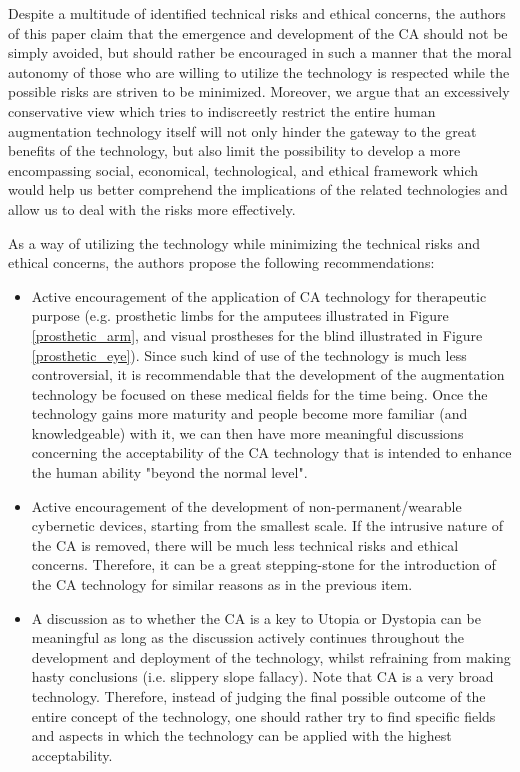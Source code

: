 Despite a multitude of identified technical risks and ethical concerns, the authors of this paper claim that the emergence and development of the CA should not be simply avoided, but should rather be encouraged in such a manner that the moral autonomy of those who are willing to utilize the technology is respected while the possible risks are striven to be minimized. Moreover, we argue that an excessively conservative view which tries to indiscreetly restrict the entire human augmentation technology itself will not only hinder the gateway to the great benefits of the technology, but also limit the possibility to develop a more encompassing social, economical, technological, and ethical framework which would help us better comprehend the implications of the related technologies and allow us to deal with the risks more effectively.

As a way of utilizing the technology while minimizing the technical risks and ethical concerns, the authors propose the following recommendations:

\begin{itemize}
	\item Active encouragement of the application of CA technology for therapeutic purpose (e.g. prosthetic limbs for the amputees illustrated in Figure \ref{prosthetic_arm}, and visual prostheses for the blind illustrated in Figure \ref{prosthetic_eye}). Since such kind of use of the technology is much less controversial, it is recommendable that the development of the augmentation technology be focused on these medical fields for the time being. Once the technology gains more maturity and people become more familiar (and knowledgeable) with it, we can then have more meaningful discussions concerning the acceptability of the CA technology that is intended to enhance the human ability "beyond the normal level".
	\item Active encouragement of the development of non-permanent/wearable cybernetic devices, starting from the smallest scale. If the intrusive nature of the CA is removed, there will be much less technical risks and ethical concerns. Therefore, it can be a great stepping-stone for the introduction of the CA technology for similar reasons as in the previous item. 
	\item A discussion as to whether the CA is a key to Utopia or Dystopia can be meaningful as long as the discussion actively continues throughout the development and deployment of the technology, whilst refraining from making hasty conclusions (i.e. slippery slope fallacy). Note that CA is a very broad technology. Therefore, instead of judging the final possible outcome of the entire concept of the technology, one should rather try to find specific fields and aspects in which the technology can be applied with the highest acceptability. 
\end{itemize}

